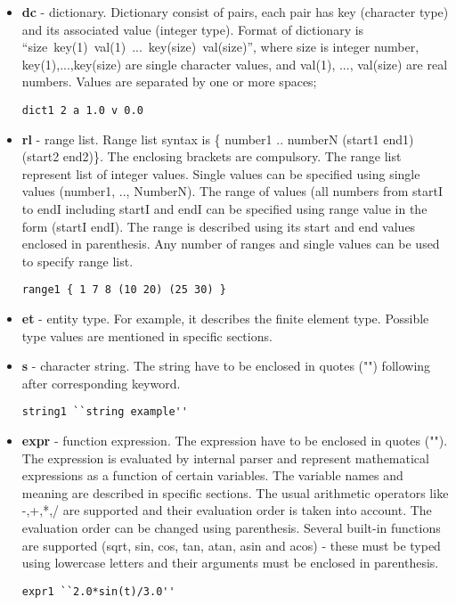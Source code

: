 \documentclass[a4paper]{report}
\begin{document}
\begin{itemize}
\item \textbf{dc} - dictionary. Dictionary consist of pairs, each pair has key
(character type) and its associated value (integer type).
Format of dictionary is
``size~key(1)~val(1)~...~key(size)~val(size)'', where size is integer
number, key(1),...,key(size) are single character values, and val(1),
..., val(size) are real numbers. Values are separated by one or more spaces;
\begin{lstlisting}[style=oofem, language=oofeminput, moreemph={dict1}]
dict1 2 a 1.0 v 0.0 
\end{lstlisting}
\item \textbf{rl} - range list. Range list syntax is \{ number1 .. numberN (start1
end1) (start2 end2)\}. The enclosing brackets are compulsory. The range
list represent list of integer values. Single values can be specified
using single values (number1, .., NumberN). The range of values
(all numbers from startI to endI including startI and endI can be
specified using range value in the form (startI endI). The range is
described using its start and end values enclosed in parenthesis.
Any number of ranges and single values can be used to specify range list.
\begin{lstlisting}[style=oofem, language=oofeminput, moreemph={range1}]
range1 { 1 7 8 (10 20) (25 30) }
\end{lstlisting}
\item \textbf{et} - entity type. For  example, it describes the finite element
type. Possible type values are mentioned in specific sections.
\item \textbf{s} - character string. The string have to be enclosed
in quotes ("") following after corresponding keyword.
\begin{lstlisting}[style=oofem, language=oofeminput, moreemph={string1}]
string1 ``string example''
\end{lstlisting}
\item \textbf{expr} - function expression. The expression have to be enclosed
in quotes (""). The expression is evaluated by internal parser and
represent mathematical expressions as a function of certain variables.
The variable names and meaning are described in specific sections.
The usual arithmetic operators like -,+,*,/ are supported and their
evaluation order is taken into account. The evaluation order can be
changed using parenthesis. Several built-in functions are supported
(sqrt, sin, cos, tan, atan, asin and acos) - these must be typed using
lowercase letters and their arguments must be enclosed in parenthesis.
\begin{lstlisting}[style=oofem, language=oofeminput, moreemph={expr1}]
expr1 ``2.0*sin(t)/3.0''
\end{lstlisting}

\end{itemize}
\end{document}
